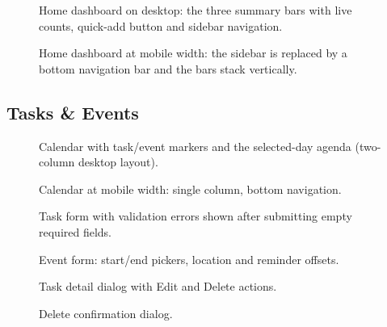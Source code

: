 \documentclass[12pt,a4paper]{article}
\begin{document}
\begin{figure}[H]
  \centering
  \caption{Home dashboard on desktop: the three summary bars with live
  counts, quick-add button and sidebar navigation.}
\end{figure}

\begin{figure}[H]
  \centering
  \caption{Home dashboard at mobile width: the sidebar is replaced by a
  bottom navigation bar and the bars stack vertically.}
\end{figure}

\subsection{Tasks \& Events}

\begin{figure}[H]
  \centering
  \caption{Calendar with task/event markers and the selected-day agenda
  (two-column desktop layout).}
\end{figure}

\begin{figure}[H]
  \centering
  \caption{Calendar at mobile width: single column, bottom navigation.}
\end{figure}

\begin{figure}[H]
  \centering
  \caption{Task form with validation errors shown after submitting empty
  required fields.}
\end{figure}

\begin{figure}[H]
  \centering
  \caption{Event form: start/end pickers, location and reminder offsets.}
\end{figure}

\begin{figure}[H]
  \centering
  \caption{Task detail dialog with Edit and Delete actions.}
\end{figure}

\begin{figure}[H]
  \centering
  \caption{Delete confirmation dialog.}
\end{figure}
\end{document}
